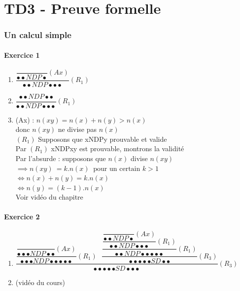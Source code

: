 \documentclass[a4paper]{article}
\newcommand\p{\bullet}
\begin{document}
\part*{TD3 - Preuve formelle}
\vspace{1cm}
\section{Un calcul simple}
\vspace{5mm}
\subsection*{Exercice 1}
\begin{enumerate}
  \item $\dfrac{\dfrac{}{\p\p NDP \p}(Ax)}{\p\p NDP\p\p\p}(R_{1})$\\
  \item  $\dfrac{\p\p NDP \p\p}{\p\p NDP\p\p\p}(R_{1})$\\
  \item (Ax) : $n(xy) = n(x) + n(y) > n(x)$ \\
    donc $n(xy)$ ne divise pas $n(x)$\\

    $(R_1)$ Supposons que xNDPy prouvable et valide \\
    Par $(R_{1})$ xNDPxy est prouvable, montrons la validité \\
    Par l'absurde : supposons que $n(x)$ divise $n(xy)$\\
    $\implies n(xy)\: = k.n(x) \: \text{ pour un certain }k>1$\\
    $\iff n(x) + n(y) = k.n(x)$\\
    $\iff n(y) = (k-1).n(x)$\\
    Voir vidéo du chapitre \\
\end{enumerate}
\subsection*{Exercice 2}
\begin{enumerate}
  \item {\large$\dfrac{\dfrac{\dfrac{}{\p\p\p NDP \p\p}(Ax)}{\p\p\p NDP\p\p\p\p\p}(R_{1})\text{      } \dfrac{\dfrac{\dfrac{\dfrac{}{\p\p NDP \p}(Ax)}{\p\p NDP \p\p\p}(R_{1})}{\p\p  NDP\p\p\p\p\p}(R_{1})}{\p\p\p\p\p SD\p\p}(R_{3})}{\p\p\p\p\p SD\p\p\p}(R_{3})$}\\
  \item (vidéo du cours)\\
\end{enumerate}
\end{document}
